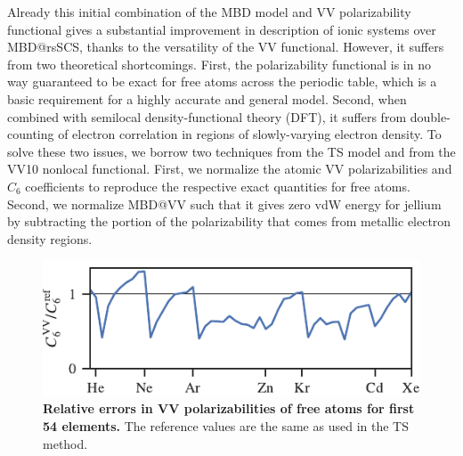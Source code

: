 Already this initial combination of the MBD model and VV polarizability functional gives a substantial improvement in description of ionic systems over MBD@rsSCS, thanks to the versatility of the VV functional.
However, it suffers from two theoretical shortcomings.
First, the polarizability functional is in no way guaranteed to be exact for free atoms across the periodic table, which is a basic requirement for a highly accurate and general model.
Second, when combined with semilocal density-functional theory (DFT), it suffers from double-counting of electron correlation in regions of slowly-varying electron density.
To solve these two issues, we borrow two techniques from the TS model and from the VV10 nonlocal functional.
First, we normalize the atomic VV polarizabilities and $C_6$ coefficients to reproduce the respective exact quantities for free atoms.
Second, we normalize MBD@VV such that it gives zero vdW energy for jellium by subtracting the portion of the polarizability that comes from metallic electron density regions.


\begin{figure}[t!]
\centering
\includegraphics{../media/vv-periodic-table.pdf}
\caption{\textbf{Relative errors in VV polarizabilities of free atoms for first 54 elements.}
The reference values are the same as used in the TS method.
}\label{fig:vv-periodic-table}
\end{figure}

